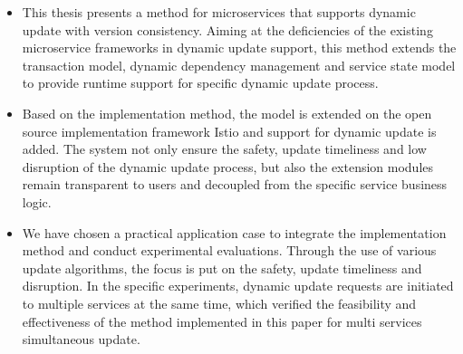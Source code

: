 \documentclass[macfonts,master]{njuthesis}
\begin{document}
\begin{englishabstract}
\begin{itemize}
  \item This thesis presents a method for microservices that supports dynamic update with version consistency. Aiming at the deficiencies of the existing microservice frameworks in dynamic update support, this method extends the transaction model, dynamic dependency management and service state model to provide runtime support for specific dynamic update process.
  \item Based on the implementation method, the model is extended on the open source implementation framework Istio and support for dynamic update is added. The system not only ensure the safety, update timeliness and low disruption of the dynamic update process, but also the extension modules remain transparent to users and decoupled from the specific service business logic.
  \item We have chosen a practical application case to integrate the implementation method and conduct experimental evaluations. Through the use of various update algorithms, the focus is put on the safety, update timeliness and disruption. In the specific experiments, dynamic update requests are initiated to multiple services at the same time, which verified the feasibility and effectiveness of the method implemented in this paper for multi services simultaneous update.
\end{itemize}
\end{englishabstract}


\tableofcontents

\listoffigures

\listoftables

\mainmatter

\end{document}
